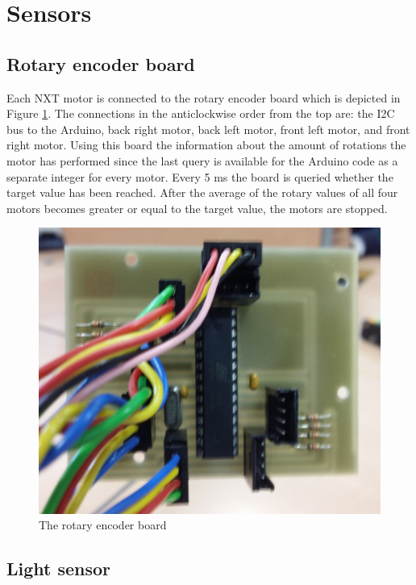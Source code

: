 \documentclass[a4paper,12pt]{article}
\begin{document}
\section{Sensors}
\subsection{Rotary encoder board}

Each NXT motor is connected to the rotary encoder board which is depicted in Figure \ref{fig:rotary}. The connections in the anticlockwise order from the top are: the I2C bus to the Arduino, back right motor, back left motor, front left motor, and front right motor. Using this board the information about the amount of rotations the motor has performed since the last query is available for the Arduino code as a separate integer for every motor. Every 5 ms the board is queried whether the target value has been reached. After the average of the rotary values of all four motors becomes greater or equal to the target value, the motors are stopped.

\begin{figure}[ht!]
\centering
\includegraphics[scale=.1]{rotary1}
\caption{The rotary encoder board}
\label{fig:rotary}
\end{figure}

\subsection{Light sensor}
\end{document}
